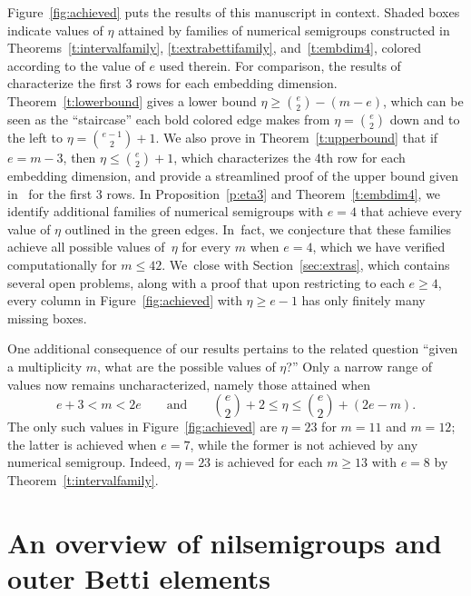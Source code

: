 \documentclass[ALCO]{cedram}
\begin{document}
Figure~\ref{fig:achieved} puts the results of this manuscript in context.  Shaded boxes indicate values of $\eta$ attained by families of numerical semigroups constructed in Theorems~\ref{t:intervalfamily}, \ref{t:extrabettifamily}, and~\ref{t:embdim4}, colored according to the value of $e$ used therein. For comparison, the results of~\cite{highembdim} characterize the first 3 rows for each embedding dimension.  Theorem~\ref{t:lowerbound} gives a lower bound $\eta \ge \binom{e}{2} - (m - e)$, which can be seen as the ``staircase'' each bold colored edge makes from $\eta = \binom{e}{2}$ down and to the left to $\eta = \binom{e-1}{2} + 1$.  We also prove in Theorem~\ref{t:upperbound} that if $e = m - 3$, then $\eta \le \binom{e}{2} + 1$, which characterizes the 4th row for each embedding dimension, and provide a streamlined proof of the upper bound given in~\cite{highembdim} for the first 3 rows.  
In Proposition~\ref{p:eta3} and Theorem~\ref{t:embdim4}, we identify additional families of numerical semigroups with $e = 4$ that achieve every value of $\eta$ outlined in the green edges.  
In~fact, we conjecture that these families achieve all possible values of~$\eta$ for every $m$ when $e = 4$, which we have verified computationally for $m \le 42$.  We~close with Section~\ref{sec:extras}, which contains several open problems, along with a proof that upon restricting to each $e \geq 4$, every column in Figure~\ref{fig:achieved} with $\eta \ge e - 1$ has only finitely many missing boxes.  

One additional consequence of our results pertains to the related question ``given a multiplicity $m$, what are the possible values of $\eta$?''  Only a narrow range of values now remains uncharacterized, namely those attained when 
$$
e + 3 < m < 2e
\qquad \text{and} \qquad
\textstyle\binom{e}{2} + 2 \le \eta \le \binom{e}{2} + (2e - m).
$$
The only such values in Figure~\ref{fig:achieved} are $\eta = 23$ for $m = 11$ and $m = 12$; the latter is achieved when $e = 7$, while the former is not achieved by any numerical semigroup. Indeed, $\eta = 23$ is achieved for each $m \ge 13$ with $e = 8$ by Theorem~\ref{t:intervalfamily}.  






\section{An overview of nilsemigroups and outer Betti elements}
\label{sec:overview}
\end{document}

